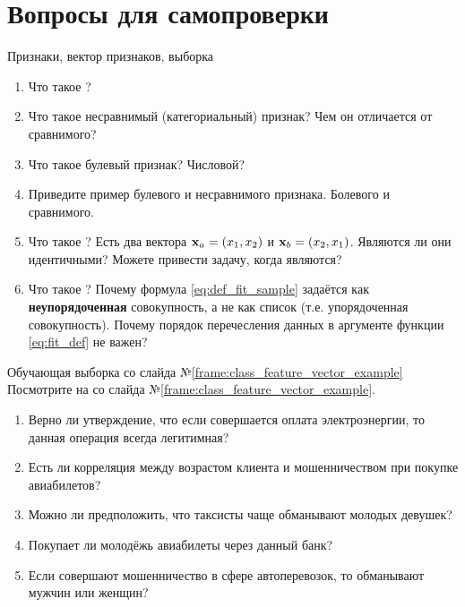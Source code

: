 \section{Вопросы для самопроверки}

   \begin{frame}{Признаки, вектор признаков, выборка}
   \begin{enumerate}
   	\item Что такое ?
   	\item Что такое несравнимый (категориальный) признак? Чем он отличается от сравнимого?
   	\item Что такое булевый признак? Числовой?
   	\item Приведите пример булевого и несравнимого признака. Болевого и сравнимого. 
   	\item Что такое ? Есть два вектора $\bold x_a = (x_1, x_2)$ и $\bold x_b = (x_2, x_1)$.
   	Являются ли они идентичными? Можете привести задачу, когда являются?
   	\item Что такое ? Почему формула \eqref{eq:def_fit_sample} задаётся
   	как \textbf{неупорядоченная} совокупность, а не как список (т.е. упорядоченная совокупность).
   	Почему порядок перечесления данных в аргументе функции \eqref{eq:fit_def} не важен?
   \end{enumerate}
	\end{frame}

\begin{frame}{Обучающая выборка со слайда №\ref{frame:class_feature_vector_example}}
 	Посмотрите на  со слайда №\ref{frame:class_feature_vector_example}. 
 	\begin{enumerate}
 	\item Верно ли утверждение, что если совершается оплата электроэнергии, то данная операция всегда легитимная?
 	\item Есть ли корреляция между возрастом клиента и мошенничеством при покупке авиабилетов? 
 	\item Можно ли предположить, что таксисты чаще обманывают молодых девушек? 
 	\item Покупает ли молодёжь авиабилеты через данный банк? 
 	\item Если совершают мошенничество в сфере автоперевозок, то обманывают мужчин или женщин?
	\end{enumerate}
	\end{frame}
  
